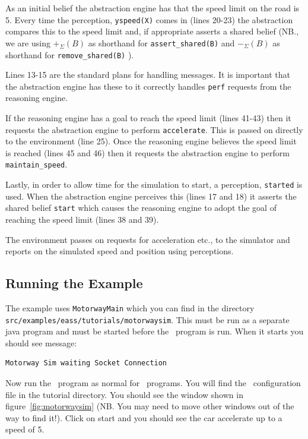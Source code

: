 \documentclass[a4]{article}
\begin{document}
As an initial belief the abstraction engine has that the speed limit on the road is 5.  Every time the perception, \lstinline{yspeed(X)} comes in (lines 20-23) the abstraction compares this to the speed limit and, if appropriate asserts a shared belief (NB., we are using $+_{\Sigma}(B)$ as shorthand for \lstinline{assert_shared(B)} and  $-_{\Sigma}(B)$ as shorthand for \lstinline{remove_shared(B)} ).

Lines 13-15 are the standard plans for handling messages.  It is important that the abstraction engine has these to it correctly handles \texttt{perf} requests from the reasoning engine.

If the reasoning engine has a goal to reach the speed limit (lines 41-43) then it requests the abstraction engine to perform \lstinline{accelerate}.  This is passed on directly to the environment (line 25).  Once the reasoning engine believes the speed limit is reached (lines 45 and 46) then it requests the abstraction engine to perform \lstinline{maintain_speed}.

Lastly, in order to allow time for the simulation to start, a perception, \lstinline{started} is used.  When the abstraction engine perceives this (lines 17 and 18) it asserts the shared belief \lstinline{start} which causes the reasoning engine to adopt the goal of reaching the speed limit (lines 38 and 39).

The environment passes on requests for acceleration etc., to the simulator and reports on the simulated speed and position using perceptions.

\subsection{Running the Example}

The example uses \texttt{MotorwayMain} which you can find in the directory \texttt{src/examples/eass/tutorials/motorwaysim}.  This must be run as a separate java program and must be started before the \eass\ program is run.  When it starts you should see message:

\begin{verbatim}
Motorway Sim waiting Socket Connection
\end{verbatim}

Now run the \eass\ program as normal for \ail\ programs.  You will find the \ail\ configuration file in the tutorial directory.  You should see the window shown in figure~\ref{fig:motorwaysim} (NB.  You may need to move other windows out of the way to find it!).  Click on start and you should see the car accelerate up to a speed of 5.
\end{document}
